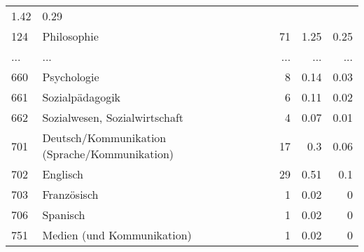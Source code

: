 \begin{longtable}{lXrrr}
          \num[round-mode=places,round-precision=2]{1,42} &
          \num[round-mode=places,round-precision=2]{0,29} \\
        124 & \multicolumn{1}{X}{Philosophie} & %
          \num{71} &
          \num[round-mode=places,round-precision=2]{1,25} &
          \num[round-mode=places,round-precision=2]{0,25} \\
       ... & ... & ... & ... & ... \\
        660 & \multicolumn{1}{X}{Psychologie} & %
          \num{8} &
          \num[round-mode=places,round-precision=2]{0,14} &
          \num[round-mode=places,round-precision=2]{0,03} \\

        661 & \multicolumn{1}{X}{Sozialpädagogik} & %
          \num{6} &
          \num[round-mode=places,round-precision=2]{0,11} &
          \num[round-mode=places,round-precision=2]{0,02} \\

        662 & \multicolumn{1}{X}{Sozialwesen, Sozialwirtschaft} & %
          \num{4} &
          \num[round-mode=places,round-precision=2]{0,07} &
          \num[round-mode=places,round-precision=2]{0,01} \\

        701 & \multicolumn{1}{X}{Deutsch/Kommunikation (Sprache/Kommunikation)} & %
          \num{17} &
          \num[round-mode=places,round-precision=2]{0,3} &
          \num[round-mode=places,round-precision=2]{0,06} \\

        702 & \multicolumn{1}{X}{Englisch} & %
          \num{29} &
          \num[round-mode=places,round-precision=2]{0,51} &
          \num[round-mode=places,round-precision=2]{0,1} \\

        703 & \multicolumn{1}{X}{Französisch} & %
          \num{1} &
          \num[round-mode=places,round-precision=2]{0,02} &
          \num[round-mode=places,round-precision=2]{0} \\

        706 & \multicolumn{1}{X}{Spanisch} & %
          \num{1} &
          \num[round-mode=places,round-precision=2]{0,02} &
          \num[round-mode=places,round-precision=2]{0} \\

        751 & \multicolumn{1}{X}{Medien (und Kommunikation)} & %
          \num{1} &
          \num[round-mode=places,round-precision=2]{0,02} &
          \num[round-mode=places,round-precision=2]{0} \\


\end{longtable}
